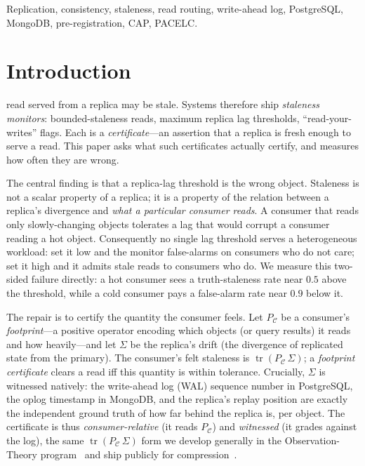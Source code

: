 \documentclass[lettersize,onecolumn]{IEEEtran}
\theoremstyle{remark}
\newcommand{\tr}{\operatorname{tr}}
\newcommand{\PC}{P_{\mathcal{C}}}
\begin{document}
\begin{IEEEkeywords}
Replication, consistency, staleness, read routing, write-ahead log, PostgreSQL,
MongoDB, pre-registration, CAP, PACELC.
\end{IEEEkeywords}

\section{Introduction}
 read served from a replica may be stale. Systems therefore
ship \emph{staleness monitors}: bounded-staleness reads, maximum replica lag
thresholds, ``read-your-writes'' flags. Each is a \emph{certificate}---an
assertion that a replica is fresh enough to serve a read. This paper asks what
such certificates actually certify, and measures how often they are wrong.

The central finding is that a replica-lag threshold is the wrong object.
Staleness is not a scalar property of a replica; it is a property of the
relation between a replica's divergence and \emph{what a particular consumer
reads}. A consumer that reads only slowly-changing objects tolerates a lag that
would corrupt a consumer reading a hot object. Consequently no single lag
threshold serves a heterogeneous workload: set it low and the monitor
false-alarms on consumers who do not care; set it high and it admits stale reads
to consumers who do. We measure this two-sided failure directly: a hot consumer
sees a truth-staleness rate near $0.5$ above the threshold, while a cold consumer
pays a false-alarm rate near $0.9$ below it.

The repair is to certify the quantity the consumer feels. Let $\PC$ be a
consumer's \emph{footprint}---a positive operator encoding which objects (or
query results) it reads and how heavily---and let $\Sigma$ be the replica's drift
(the divergence of replicated state from the primary). The consumer's felt
staleness is $\tr(\PC\,\Sigma)$; a \emph{footprint certificate} clears a read iff
this quantity is within tolerance. Crucially, $\Sigma$ is witnessed
natively: the write-ahead log (WAL) sequence number in PostgreSQL, the oplog
timestamp in MongoDB, and the replica's replay position are exactly the
independent ground truth of how far behind the replica is, per object. The
certificate is thus \emph{consumer-relative} (it reads $\PC$) and \emph{witnessed}
(it grades against the log), the same $\tr(\PC\,\Sigma)$ form we develop generally
in the Observation-Theory program~\cite{bond_ot} and ship publicly for
compression~\cite{bond_turboquant}.
\end{document}
